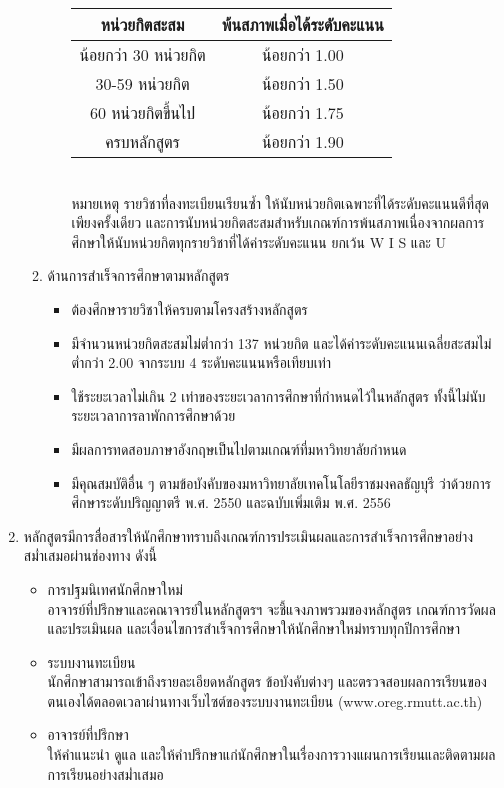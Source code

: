 \begin{enumerate}
\begin{enumerate}[label=\arabic*),leftmargin=0.7cm]
\begin{itemize}
			\begin{tabular}{|c|c|}
				\hline
				\textbf{หน่วยกิตสะสม}& \textbf{พ้นสภาพเมื่อได้ระดับคะแนน}\\\hline
				น้อยกว่า 30 หน่วยกิต& น้อยกว่า 1.00\\\hline
				30-59 หน่วยกิต& น้อยกว่า 1.50\\\hline
				60 หน่วยกิตขึ้นไป &  น้อยกว่า 1.75\\\hline
				ครบหลักสูตร &  น้อยกว่า 1.90\\\hline
			\end{tabular}\\
			หมายเหตุ รายวิชาที่ลงทะเบียนเรียนซ้ำ ให้นับหน่วยกิตเฉพาะที่ได้ระดับคะแนนดีที่สุดเพียงครั้งเดียว และการนับหน่วยกิตสะสมสำหรับเกณฑ์การพ้นสภาพเนื่องจากผลการศึกษาให้นับหน่วยกิตทุกรายวิชาที่ได้ค่าระดับคะแนน ยกเว้น W I S และ U
		\end{itemize}
		\item ด้านการสำเร็จการศึกษาตามหลักสูตร
		\begin{itemize}
			\item ต้องศึกษารายวิชาให้ครบตามโครงสร้างหลักสูตร
			\item มีจำนวนหน่วยกิตสะสมไม่ต่ำกว่า 137 หน่วยกิต และได้ค่าระดับคะแนนเฉลี่ยสะสมไม่ต่ำกว่า 2.00 จากระบบ 4 ระดับคะแนนหรือเทียบเท่า
			\item ใช้ระยะเวลาไม่เกิน 2 เท่าของระยะเวลาการศึกษาที่กำหนดไว้ในหลักสูตร ทั้งนี้ไม่นับระยะเวลาการลาพักการศึกษาด้วย
			\item มีผลการทดสอบภาษาอังกฤษเป็นไปตามเกณฑ์ที่มหาวิทยาลัยกำหนด
			\item มีคุณสมบัติอื่น ๆ ตามข้อบังคับของมหาวิทยาลัยเทคโนโลยีราชมงคลธัญบุรี ว่าด้วยการศึกษาระดับปริญญาตรี พ.ศ. 2550 และฉบับเพิ่มเติม พ.ศ. 2556
		\end{itemize}
	\end{enumerate}	
	\item หลักสูตรมีการสื่อสารให้นักศึกษาทราบถึงเกณฑ์การประเมินผลและการสำเร็จการศึกษาอย่างสม่ำเสมอผ่านช่องทาง ดังนี้
	\begin{itemize}
		\item การปฐมนิเทศนักศึกษาใหม่\\อาจารย์ที่ปรึกษาและคณาจารย์ในหลักสูตรฯ จะชี้แจงภาพรวมของหลักสูตร เกณฑ์การวัดผลและประเมินผล และเงื่อนไขการสำเร็จการศึกษาให้นักศึกษาใหม่ทราบทุกปีการศึกษา
		\item ระบบงานทะเบียน\\ นักศึกษาสามารถเข้าถึงรายละเอียดหลักสูตร ข้อบังคับต่างๆ และตรวจสอบผลการเรียนของตนเองได้ตลอดเวลาผ่านทางเว็บไซต์ของระบบงานทะเบียน (www.oreg.rmutt.ac.th)
		\item อาจารย์ที่ปรึกษา\\ให้คำแนะนำ ดูแล และให้คำปรึกษาแก่นักศึกษาในเรื่องการวางแผนการเรียนและติดตามผลการเรียนอย่างสม่ำเสมอ
	\end{itemize}
\end{enumerate}

